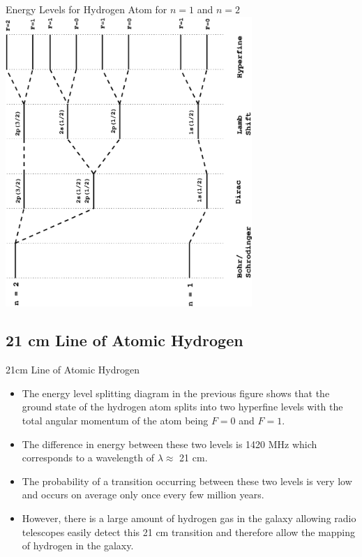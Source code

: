 \documentclass[xcolor=dvipsnames,t]{beamer}
\begin{document}
    \begin{frame}{Energy Levels for Hydrogen Atom for $n=1$ and $n=2$} 
        \centering
        \includegraphics[angle=-90,width=0.7\textwidth]{all.eps}
    \end{frame} 


    \subsection{21 cm Line of Atomic Hydrogen}
    \begin{frame}{21cm Line of Atomic Hydrogen} 
        \begin{itemize} 
            \item The energy level splitting diagram in the previous figure shows that the ground state of
    the hydrogen atom splits into two hyperfine levels with the total angular
    momentum of the atom being $F=0$ and $F=1$.
\item The difference in energy between these two levels is 1420 MHz which corresponds
    to a wavelength of $\lambda \approx $ 21 cm. 
\item The probability of a transition occurring between these two levels is very low and occurs on average only 
    once every few million years. 
\item However, there is a large amount of hydrogen gas
    in the galaxy allowing radio telescopes easily detect this 21 cm transition and
    therefore allow the mapping of hydrogen in the galaxy.
        \end{itemize} 
    \end{frame} 
\end{document}
